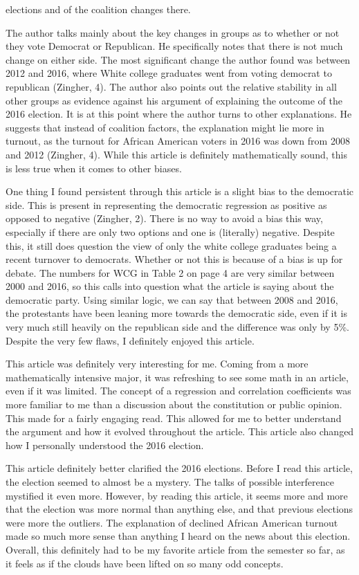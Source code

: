 \documentclass[12pt]{article}
\begin{document}
elections and of the coalition changes there.
\par
The author talks mainly about the key changes in groups as to whether
or not they vote Democrat or Republican. He specifically notes that
there is not much change on either side. The most significant change
the author found was between 2012 and 2016, where White college
graduates went from voting democrat to republican (Zingher, 4). The
author also points out the relative stability in all other groups as
evidence against his argument of explaining the outcome of the 2016
election. It is at this point where the author turns to other
explanations. He suggests that instead of coalition factors, the
explanation might lie more in turnout, as the turnout for African
American voters in 2016 was down from 2008 and 2012 (Zingher,
4). While this article is definitely mathematically sound, this is
less true when it comes to other biases. 
\par
One thing I found persistent through this article is a slight bias to
the democratic side. This is present in representing the democratic
regression as positive as opposed to negative (Zingher, 2). There is
no way to avoid a bias this way, especially if there are only two
options and one is (literally) negative. Despite this, it still does
question the view of only the white college graduates being a recent
turnover to democrats. Whether or not this is because of a bias is up
for debate. The numbers for WCG in Table 2 on page 4 are very similar
between 2000 and 2016, so this calls into question what the article is
saying about the democratic party. Using similar logic, we can say
that between 2008 and 2016, the protestants have been leaning more
towards the democratic side, even if it is very much still heavily on
the republican side and the difference was only by 5\%. Despite the
very few flaws, I definitely enjoyed this article. 
\par
This article was definitely very interesting for me. Coming from a
more mathematically intensive major, it was refreshing to see some
math in an article, even if it was limited. The concept of a
regression and correlation coefficients was more familiar to me than
a discussion about the constitution or public opinion. This made for a
fairly engaging read. This allowed for me to better understand the
argument and how it evolved throughout the article. This article also
changed how I personally understood the 2016 election. 
\par
This article definitely better clarified the 2016 elections. Before I
read this article, the election seemed to almost be a mystery. The
talks of possible interference mystified it even more. However, by
reading this article, it seems more and more that the election was
more normal than anything else, and that previous elections were more
the outliers. The explanation of declined African American turnout
made so much more sense than anything I heard on the news about this
election. Overall, this definitely had to be my favorite article from
the semester so far, as it feels as if the clouds have been lifted on
so many odd concepts. 
\end{document}
